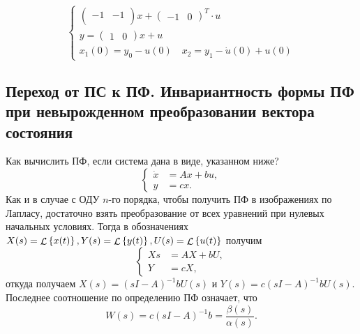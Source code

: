 \documentclass[../../TAU.tex]{subfiles}
\begin{document}
{$$\begin{cases}
\begin{pmatrix}
                    -1 & -1 \\
                \end{pmatrix}
                x+
                \begin{pmatrix}
                    -1 & 0
                \end{pmatrix}^T
                \cdot u          \\
                y = 
                \begin{pmatrix}
                    1 & 0
                \end{pmatrix}
                x + u            \\
                x_1(0)=y_0-u(0)\quad x_2=y_1-\dot u(0)+u(0)
            \end{cases}        
        $$
    }

\subsection{Переход от ПС к ПФ. Инвариантность формы 
ПФ при невырожденном преобразовании вектора состояния}

    Как вычислить ПФ, если система дана в виде, указанном ниже?
    $$
        \left\{
        \begin{aligned}
            \dot x &= Ax+bu,\\
            y&= cx.
        \end{aligned}
        \right.
    $$
    Как и в случае с ОДУ $n$-го порядка, чтобы получить ПФ в изображениях по Лапласу, достаточно взять преобразование от всех уравнений при нулевых начальных условиях. Тогда в обозначениях 
    $X(s)=\mathop{\mathcal{L}}\nolimits\left\{x(t)\right\}, Y(s)=\mathop{\mathcal{L}}\nolimits\left\{y(t)\right\}, U(s) = \mathop{\mathcal{L}}\nolimits\left\{u(t)\right\}$ 
    получим
    $$
        \left\{
        \begin{aligned}
            Xs &= AX+bU,\\
            Y &= cX,
        \end{aligned}
        \right.
    $$
    откуда получаем 
    $X(s) = (sI-A)^{-1}b U(s)$ 
    и 
    $Y(s) = c(sI-A)^{-1}b U(s)$. 
    Последнее соотношение по определению ПФ означает, что
    $$
        W(s) = c (sI-A)^{-1}b = \frac{\beta(s)}{\alpha(s)}.
    $$
\end{document}
